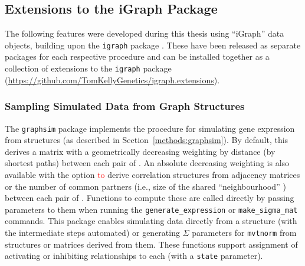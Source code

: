
\subsection{Extensions to the iGraph Package} \label{methods:igraph_extensions}
The following features were developed during this thesis using ``iGraph'' data objects, building upon the \texttt{igraph} package \citep{igraph}. These have been released as separate packages for each respective procedure and can be installed together as a collection of extensions to the \texttt{igraph} package (\url{https://github.com/TomKellyGenetics/igraph.extensions}).

\subsubsection{Sampling Simulated Data from Graph Structures}
The \texttt{graphsim} package implements the procedure for simulating \gls{gene expression} from  structures (as described in Section~\ref{methods:graphsim}). By default, this derives a matrix with a geometrically decreasing weighting by distance (by \glspl{shortest path}) between each pair of \textcolor{red}{}. An absolute decreasing weighting is also available with the option \textcolor{red}{to} derive correlation structures from adjacency matrices or the number of  common partners (i.e., size of the shared ``neighbourhood'' \citep{Hell1976}) between each pair of . Functions to compute these are called directly by passing parameters to them when running the \texttt{generate\_expression} or \texttt{make\_sigma\_mat} commands. This package enables simulating  data directly from a  structure (with the intermediate steps automated) or generating $\Sigma$ parameters for \texttt{mvtnorm} from  structures or matrices derived from them. These functions support assignment of activating or inhibiting relationships to each  (with a \texttt{state} parameter).

